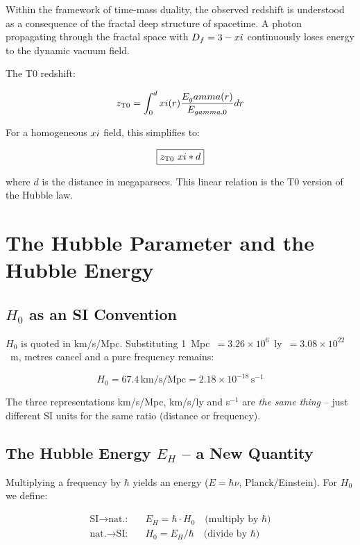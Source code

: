 Within the framework of time-mass duality, the observed redshift is 
understood as a consequence of the fractal deep structure of spacetime. A 
photon propagating through the fractal space with $D_f = 3 - xi$ 
continuously loses energy to the dynamic vacuum field.

The T0 redshift:

\begin{equation}
z_{\text{T0}} = \int_0^d xi(r) \frac{E_gamma(r)}{E_{gamma,0}} dr
\end{equation}

For a homogeneous $xi$ field, this simplifies to:

\begin{equation}
\boxed{z_{\text{T0}} ~ xi * d}
\label{eq:z_T0_linear}
\end{equation}

where $d$ is the distance in megaparsecs. This linear relation is the 
T0 version of the Hubble law.

\section{The Hubble Parameter and the Hubble Energy}

\subsection{$H_0$ as an SI Convention}

$H_0$ is quoted in km/s/Mpc. Substituting 
1~Mpc~$= 3.26 \times 10^6$~ly~$= 3.08 \times 10^{22}$~m, 
metres cancel and a pure frequency remains:

\begin{equation}
H_0 = 67.4\,\text{km/s/Mpc} = 2.18 \times 10^{-18}\,\text{s}^{-1}
\end{equation}

The three representations km/s/Mpc, km/s/ly and s$^{-1}$ are 
\emph{the same thing} -- just different SI units for the same 
ratio (distance or frequency).

\subsection{The Hubble Energy $E_H$ -- a New Quantity}

Multiplying a frequency by $\hbar$ yields an energy 
($E = \hbar\nu$, Planck/Einstein). For $H_0$ we define:

\begin{align}
\text{SI} \to \text{nat.:} \quad & E_H = \hbar \cdot H_0 
\quad\text{(multiply by $\hbar$)} \\
\text{nat.} \to \text{SI:} \quad & H_0 = E_H / \hbar
\quad\text{(divide by $\hbar$)}
\end{align}

